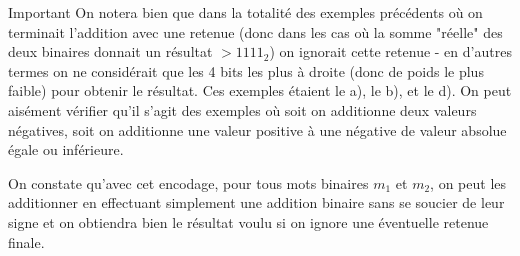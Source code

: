 \documentclass[12pt]{article}
\begin{document}
\begin{MaReponse}
\begin{alphenum}
		\begin{MonAmp}{Important}
			On notera bien que dans la totalité des exemples précédents où on terminait l'addition avec une retenue (donc dans les cas où la somme "réelle" des deux binaires donnait un résultat $> 1111_2$) on ignorait cette retenue - en d'autres termes on ne considérait que les 4 bits les plus à droite (donc de poids le plus faible) pour obtenir le résultat. Ces exemples étaient le a), le b), et le d). On peut aisément vérifier qu'il s'agit des exemples où soit on additionne deux valeurs négatives, soit on additionne une valeur positive à une négative de valeur absolue égale ou inférieure.
		\end{MonAmp}
		 
		\end{alphenum}
	\end{MaReponse}
	
	On constate qu'avec cet encodage, pour tous mots binaires $m_1$ et $m_2$, on peut les additionner en effectuant simplement une addition binaire sans se soucier de leur signe et on obtiendra bien le résultat voulu si on ignore une éventuelle retenue finale.
	
\end{document}
